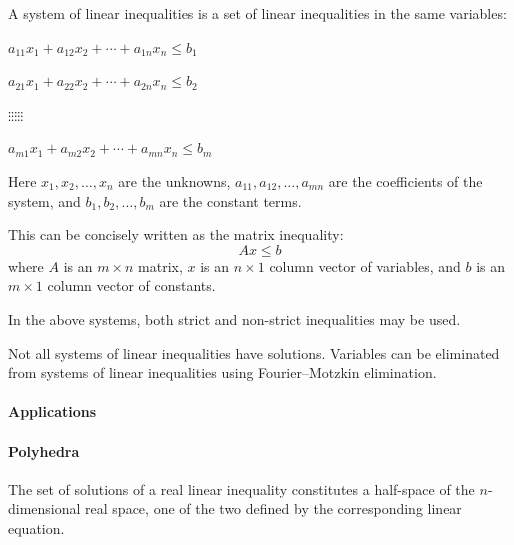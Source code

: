 A system of linear inequalities is a set of linear inequalities in the same variables:



$ a_{11} x_1 + a_{12} x_2  + \cdots + a_{1n} x_n \leq b_1 $



$ a_{21} x_1 + a_{22} x_2 + \cdots + a_{2n} x_n \leq b_2 $ 



$             \vdots                         \vdots                          \vdots                          \vdots                          \vdots $



$ a_{m1} x_1 + a_{m2} x_2 + \cdots + a_{mn} x_n \leq b_m $ 





Here $x_1, x_2, \ldots, x_n$ are the unknowns, $a_{11}, a_{12}, \ldots, a_{mn}$ are the coefficients of the system, and $b_1, b_2, \ldots, b_m$ are the constant terms.



This can be concisely written as the matrix inequality:
$$
Ax \leq b
$$
where $A$ is an $m \times n$ matrix, $x$ is an $n \times 1$ column vector of variables, and $b$ is an $m \times 1$ column vector of constants.



In the above systems, both strict and non-strict inequalities may be used.



Not all systems of linear inequalities have solutions. Variables can be eliminated from systems of linear inequalities using Fourier–Motzkin elimination.



\paragraph{Applications}



\paragraph{Polyhedra}



The set of solutions of a real linear inequality constitutes a half-space of the $n$-dimensional real space, one of the two defined by the corresponding linear equation.



